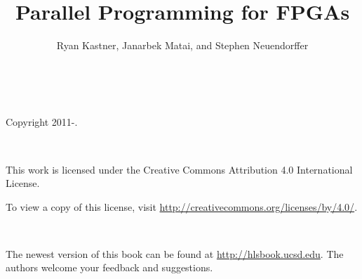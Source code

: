 \documentclass[11pt]{book} %
\title{Parallel Programming for FPGAs}
\author{Ryan Kastner, Janarbek Matai, and Stephen Neuendorffer\\\note{Notes are enabled}}
\newcommand{\note}[1]{}
\begin{document}
\setlength{\emergencystretch}{5em}
\setlength{\fboxrule}{1pt}
\setlength{\fboxsep}{9pt}

\setlength{\FrameRule}{\fboxrule}
\setlength{\FrameSep}{\fboxsep}


\newpage\leavevmode\thispagestyle{empty}\newpage

\maketitle
{} \ \\
\begin{center}
\setlength{\parskip}{0.5\baselineskip}
Copyright 2011-\the\year.
\end{center}
\vspace*{20mm} \ \\
\begin{minipage}{\linewidth}
This work is licensed under the Creative Commons Attribution 4.0 International License.

To view a copy of this license, visit \url{http://creativecommons.org/licenses/by/4.0/}. 
\end{minipage}
\vspace*{20mm} \ \\
\begin{minipage}{\linewidth}
The newest version of this book can be found at \url{http://hlsbook.ucsd.edu}.  The authors welcome your feedback and suggestions.
\end{minipage}
 \ \\
\newpage
\tableofcontents
\newpage
















%
%


 
\printnoidxglossaries
\end{document}
